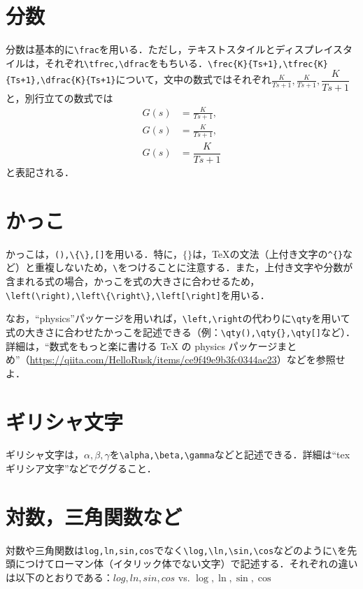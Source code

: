\documentclass[11pt,a4paper]{jsarticle}
\begin{document}
\section{分数}

分数は基本的に\verb|\frac|を用いる．ただし，テキストスタイルとディスプレイスタイルは，それぞれ\verb|\tfrec,\dfrac|をもちいる．\verb|\frec{K}{Ts+1},\tfrec{K}{Ts+1},\dfrac{K}{Ts+1}|について，文中の数式ではそれぞれ$\frac{K}{Ts+1},\tfrac{K}{Ts+1},\dfrac{K}{Ts+1}$と，別行立ての数式では
\begin{align*}
  G(s) & =\frac{K}{Ts+1},  \\
  G(s) & =\tfrac{K}{Ts+1}, \\
  G(s) & =\dfrac{K}{Ts+1}
\end{align*}
と表記される．

\section{かっこ}

かっこは，\verb|(),\{\},[]|を用いる．特に，$\{\}$は，\TeX の文法（上付き文字の\verb|^{}|など）と重複しないため，\verb|\|をつけることに注意する．また，上付き文字や分数が含まれる式の場合，かっこを式の大きさに合わせるため，\verb|\left(\right),\left\{\right\},\left[\right]|を用いる．

なお，``physics''パッケージを用いれば，\verb|\left,\right|の代わりに\verb|\qty|を用いて式の大きさに合わせたかっこを記述できる（例：\verb|\qty(),\qty{},\qty[]|など）．詳細は，``数式をもっと楽に書ける TeX の physics パッケージまとめ''（\url{https://qiita.com/HelloRusk/items/ce9f49e9b3fc0344ae23}）などを参照せよ．

\section{ギリシャ文字}

ギリシャ文字は，$\alpha,\beta,\gamma$を\verb|\alpha,\beta,\gamma|などと記述できる．詳細は``tex ギリシア文字''などでググること．

\section{対数，三角関数など}

対数や三角関数は\verb|log,ln,sin,cos|でなく\verb|\log,\ln,\sin,\cos|などのように\verb|\|を先頭につけてローマン体（イタリック体でない文字）で記述する．それぞれの違いは以下のとおりである：$log,ln,sin,cos$ vs. $\log,\ln,\sin,\cos$
\end{document}
